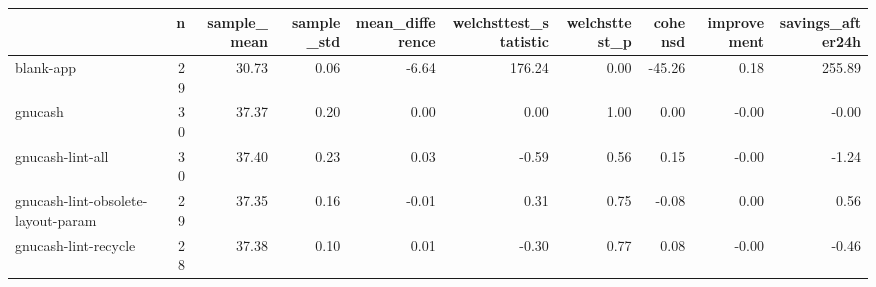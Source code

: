 \begin{tabular}{lrrrrrrrrr}
\toprule
{} &   n &  sample\_mean &  sample\_std &  mean\_difference &  welchsttest\_statistic &  welchsttest\_p &  cohensd &  improvement &  savings\_after24h \\
\midrule
blank-app                          &  29 &        30.73 &        0.06 &            -6.64 &                 176.24 &           0.00 &   -45.26 &         0.18 &            255.89 \\
gnucash                            &  30 &        37.37 &        0.20 &             0.00 &                   0.00 &           1.00 &     0.00 &        -0.00 &             -0.00 \\
gnucash-lint-all                   &  30 &        37.40 &        0.23 &             0.03 &                  -0.59 &           0.56 &     0.15 &        -0.00 &             -1.24 \\
gnucash-lint-obsolete-layout-param &  29 &        37.35 &        0.16 &            -0.01 &                   0.31 &           0.75 &    -0.08 &         0.00 &              0.56 \\
gnucash-lint-recycle               &  28 &        37.38 &        0.10 &             0.01 &                  -0.30 &           0.77 &     0.08 &        -0.00 &             -0.46 \\
\bottomrule
\end{tabular}

